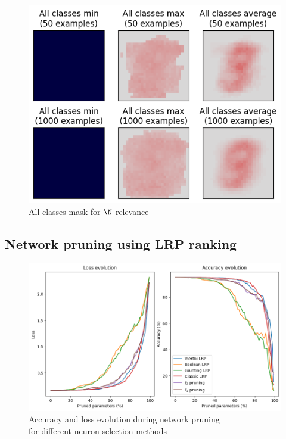 \documentclass{../cs-classes/cs-classes}
\newcommand*{\1}{\digitsbb{1}}
\newcommand*{\0}{\digitsbb{0}}
\begin{document}
\begin{figure}[H]
    \centering
    \includegraphics[width=.5\textwidth]{counting-mask-all.png}
    \caption{All classes mask for $\N$-relevance}
\end{figure}

\subsection{Network pruning using LRP ranking}
\begin{figure}[H]
    \centering
    \includegraphics[width=.7\textwidth]{pruning-graph-large.png}
    \caption{Accuracy and loss evolution during network pruning\\ for different neuron selection methods}
\end{figure}
\end{document}
